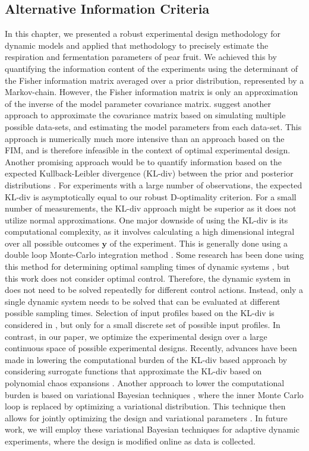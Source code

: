 \subsection{Alternative Information Criteria}
In this chapter, we presented a robust experimental design methodology for dynamic models and applied that methodology to precisely estimate the respiration and fermentation parameters of {\color{red}pear fruit}. We achieved this by quantifying the information content of the experiments using the determinant of the Fisher information matrix averaged over a prior distribution, represented by a Markov-chain. {\color{red}However, the Fisher information matrix is only an approximation of the inverse of the model parameter covariance matrix. \textcite{schenkendorf} suggest another approach to approximate the covariance matrix based on simulating multiple possible data-sets, and estimating the model parameters from each data-set. This approach is numerically much more intensive than an approach based on the FIM, and is therefore infeasible in the context of optimal experimental design. Another promising} approach would be to quantify information based on the expected Kullback-Leibler divergence (KL-div) between the prior and posterior distributions \parencite{lindley}. For {\color{red}experiments with a large number of observations}, the expected KL-div is asymptotically equal to our {\color{red}robust} D-optimality criterion. For {\color{red}a small number of measurements}, the KL-div approach might be superior as it does not utilize normal approximations. One major downside of using the KL-div is its computational complexity, as it involves calculating a high dimensional integral over all possible outcomes $\bm y $ of the experiment. This is generally done using a double loop Monte-Carlo integration method \parencite{ryan}. Some research has been done using this method for determining optimal sampling times of dynamic systems \parencite{overstall2}, but this work does not consider optimal control. Therefore, the dynamic system in  \textcite{overstall2} does not need to be  solved repeatedly for different control actions. Instead, only a single dynamic system needs to be solved that can be evaluated at different possible sampling times. Selection of input profiles based on the KL-div is considered in \textcite{liepe}, but only for a small  discrete set of possible input profiles. In contrast, in our paper, we optimize the experimental design over a large continuous space of possible experimental designs. Recently, advances have been made in lowering the computational burden of the KL-div based approach by considering {\color{red} surrogate functions that approximate the KL-div based on polynomial chaos expansions \parencite{paulson}. Another approach to lower the computational burden is based on} variational Bayesian techniques \parencite{foster}, where the inner Monte Carlo loop is replaced by optimizing a variational distribution. This technique then allows for jointly optimizing the design and variational parameters \parencite{foster2}. In future work, we will employ these variational Bayesian techniques for adaptive dynamic experiments, where the design is modified online as data is collected.
